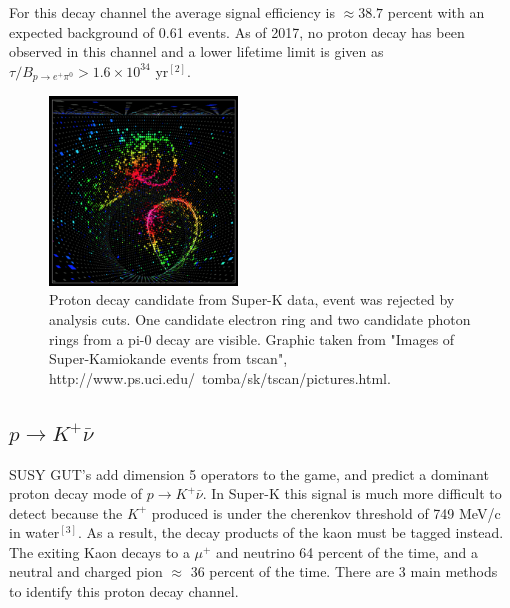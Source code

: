 \documentclass[aps,onecolumn,twoside,secnumarabic,balancelastpage,amsmath,amssymb,nofootinbib,hyperref=pdftex]{revtex4}
\begin{document}
For this decay channel the average signal efficiency is $\approx 38.7$ percent with an expected background of 0.61 events. As of 2017, no proton decay has been observed in this channel and a lower lifetime limit is given as $\tau/B_{p\rightarrow e^{+}\pi^{0}} > 1.6 \times 10^{34}$ yr$^{[2]}$.

\begin{figure}[htbp]
\begin{center}
\includegraphics[width=5cm]{rings.png}
\caption{Proton decay candidate from Super-K data, event was rejected by analysis cuts. One candidate electron ring and two candidate photon rings from a pi-0 decay are visible. Graphic taken from "Images of Super-Kamiokande events from tscan", http://www.ps.uci.edu/~tomba/sk/tscan/pictures.html.}
\label{default}
\end{center}
\end{figure}

\subsection{$p \rightarrow K^{+}\bar{\nu}$}

SUSY GUT's add dimension 5 operators to the game, and predict a dominant proton decay mode of $p \rightarrow K^{+}\bar{\nu}$. In Super-K this signal is much more difficult to detect because the $K^{+}$ produced is under the cherenkov threshold of 749 MeV/c in water$^{[3]}$. As a result, the decay products of the kaon must be tagged instead. The exiting Kaon decays to a $\mu^{+}$ and neutrino 64 percent of the time, and a neutral and charged pion $\approx$ 36 percent of the time. There are 3 main methods to identify this proton decay channel.
\end{document}
